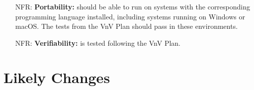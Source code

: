 \documentclass[12pt]{article}
\newcounter{nfrnum} %
\begin{document}
\begin{itemize}

  \item[NFR\refstepcounter{nfrnum}\thenfrnum \label{NFR_portability}:]
    \textbf{Portability:} \progname{} should be able to run on systems with the
    corresponding programming language
    installed, including systems running on Windows or macOS. The tests from
    the VnV Plan should pass in these environments.

  \item[NFR\refstepcounter{nfrnum}\thenfrnum \label{NFR_verifiability}:]
    \textbf{Verifiability:} \progname{} is tested following the VnV Plan.


\end{itemize}

\section{Likely Changes} \label{sec_LCs}
\end{document}
